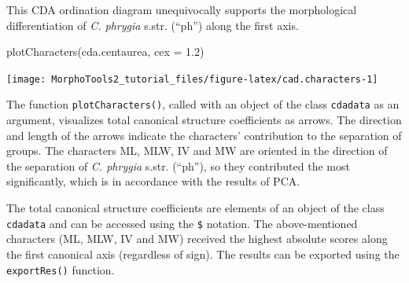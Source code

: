 \documentclass[
  11pt,
  a4paper]{article}
\newenvironment{Shaded}{\begin{snugshade}}{\end{snugshade}}
\newcommand{\AttributeTok}[1]{\textcolor[rgb]{0.77,0.63,0.00}{#1}}
\newcommand{\FloatTok}[1]{\textcolor[rgb]{0.00,0.00,0.81}{#1}}
\newcommand{\FunctionTok}[1]{\textcolor[rgb]{0.00,0.00,0.00}{#1}}
\newcommand{\NormalTok}[1]{#1}
\newcommand{\SpecialCharTok}[1]{\textcolor[rgb]{0.00,0.00,0.00}{#1}}
\newcommand{\StringTok}[1]{\textcolor[rgb]{0.31,0.60,0.02}{#1}}
\begin{document}
This CDA ordination diagram unequivocally supports the morphological
differentiation of \emph{C. phrygia} s.str. (``ph'') along the first
axis.

\begin{Shaded}
\begin{Highlighting}[]
\FunctionTok{plotCharacters}\NormalTok{(cda.centaurea, }\AttributeTok{cex =} \FloatTok{1.2}\NormalTok{)}
\end{Highlighting}
\end{Shaded}

\begin{center}\texttt{[image: MorphoTools2\_tutorial\_files/figure-latex/cad.characters-1]} \end{center}

The function \texttt{plotCharacters()}, called with an object of the
class \texttt{cdadata} as an argument, visualizes total canonical
structure coefficients as arrows. The direction and length of the arrows
indicate the characters' contribution to the separation of groups. The
characters ML, MLW, IV and MW are oriented in the direction of the
separation of \emph{C. phrygia} s.str. (``ph''), so they contributed the
most significantly, which is in accordance with the results of PCA.

The total canonical structure coefficients are elements of an object of
the class \texttt{cdadata} and can be accessed using the \texttt{\$}
notation. The above-mentioned characters (ML, MLW, IV and MW) received
the highest absolute scores along the first canonical axis (regardless
of sign). The results can be exported using the \texttt{exportRes()}
function.

\begin{Shaded}
\end{Shaded}

\vspace{-0.7cm}
\end{document}
